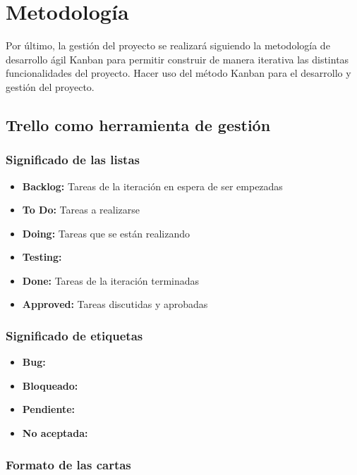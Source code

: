 \section{Metodología}\label{sec:metodologia}
Por último, la gestión del proyecto se realizará siguiendo la metodología de desarrollo ágil Kanban para permitir construir de manera iterativa las distintas funcionalidades del proyecto.
Hacer uso del método Kanban para el desarrollo y gestión del proyecto.





\subsection{Trello como herramienta de gestión}\label{subsec:trello}
\subsubsection{Significado de las listas}
\begin{itemize}
    \item \textbf{Backlog:} Tareas de la iteración en espera de ser empezadas
    \item \textbf{To Do:} Tareas a realizarse
    \item \textbf{Doing:} Tareas que se están realizando
    \item \textbf{Testing:}
    \item \textbf{Done:} Tareas de la iteración terminadas
    \item \textbf{Approved:} Tareas discutidas y aprobadas
\end{itemize}

\subsubsection{Significado de etiquetas}
\begin{itemize}
    \item \textbf{Bug:}
    \item \textbf{Bloqueado:}
    \item \textbf{Pendiente:}
    \item \textbf{No aceptada:}
\end{itemize}

\subsubsection{Formato de las cartas}
